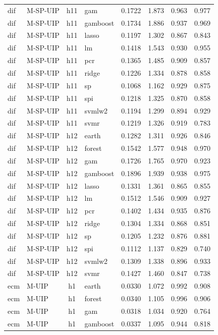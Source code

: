 \begin{ThreePartTable}
\begin{longtable}[t]{llclcccc}
dif & M-SP-UIP & h11 & gam & 0.1722 & 1.873 & 0.963 & 0.977\\
dif & M-SP-UIP & h11 & gamboost & 0.1734 & 1.886 & 0.937 & 0.969\\
dif & M-SP-UIP & h11 & lasso & 0.1197 & 1.302 & 0.867 & 0.843\\
dif & M-SP-UIP & h11 & lm & 0.1418 & 1.543 & 0.930 & 0.955\\
dif & M-SP-UIP & h11 & pcr & 0.1365 & 1.485 & 0.909 & 0.857\\
dif & M-SP-UIP & h11 & ridge & 0.1226 & 1.334 & 0.878 & 0.858\\
dif & M-SP-UIP & h11 & sp & 0.1068 & 1.162 & 0.929 & 0.875\\
dif & M-SP-UIP & h11 & spi & 0.1218 & 1.325 & 0.870 & 0.858\\
dif & M-SP-UIP & h11 & svmlw2 & 0.1194 & 1.299 & 0.894 & 0.929\\
dif & M-SP-UIP & h11 & svmr & 0.1219 & 1.326 & 0.919 & 0.783\\
\addlinespace
dif & M-SP-UIP & h12 & earth & 0.1282 & 1.311 & 0.926 & 0.846\\
dif & M-SP-UIP & h12 & forest & 0.1542 & 1.577 & 0.948 & 0.970\\
dif & M-SP-UIP & h12 & gam & 0.1726 & 1.765 & 0.970 & 0.923\\
dif & M-SP-UIP & h12 & gamboost & 0.1896 & 1.939 & 0.938 & 0.975\\
dif & M-SP-UIP & h12 & lasso & 0.1331 & 1.361 & 0.865 & 0.855\\
dif & M-SP-UIP & h12 & lm & 0.1512 & 1.546 & 0.909 & 0.927\\
dif & M-SP-UIP & h12 & pcr & 0.1402 & 1.434 & 0.935 & 0.876\\
dif & M-SP-UIP & h12 & ridge & 0.1304 & 1.334 & 0.868 & 0.851\\
dif & M-SP-UIP & h12 & sp & 0.1205 & 1.232 & 0.876 & 0.881\\
dif & M-SP-UIP & h12 & spi & 0.1112 & 1.137 & 0.829 & 0.740\\
dif & M-SP-UIP & h12 & svmlw2 & 0.1309 & 1.338 & 0.896 & 0.933\\
dif & M-SP-UIP & h12 & svmr & 0.1427 & 1.460 & 0.847 & 0.738\\
\addlinespace
ecm & M-UIP & h1 & earth & 0.0330 & 1.072 & 0.992 & 0.908\\
ecm & M-UIP & h1 & forest & 0.0340 & 1.105 & 0.996 & 0.906\\
ecm & M-UIP & h1 & gam & 0.0318 & 1.034 & 0.920 & 0.764\\
ecm & M-UIP & h1 & gamboost & 0.0337 & 1.095 & 0.944 & 0.818\\

\end{longtable}
\end{ThreePartTable}
